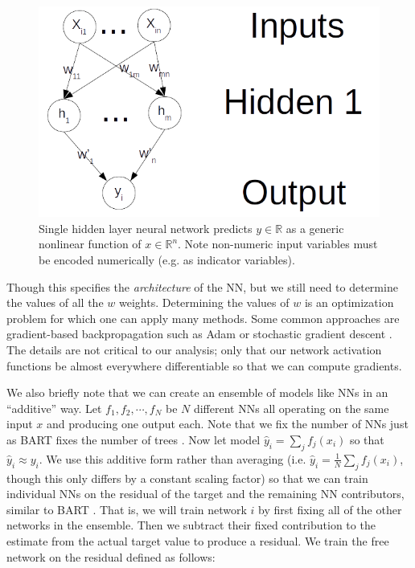 \documentclass[12pt]{article}
\begin{document}
\begin{figure}[htb]
\centering
    \includegraphics[scale=1]{nn.png}
    \caption{Single hidden layer neural network predicts $y \in \mathbb{R}$ as a generic nonlinear function of $x \in \mathbb{R}^n$.  Note non-numeric input variables must be encoded numerically (e.g. as indicator variables).}
    \label{fig:nn}
\end{figure}

Though this specifies the \emph{architecture} of the NN, but we still need to determine the values of all the $w$ weights.  Determining the values of $w$ is an optimization problem for which one can apply many methods.  Some common approaches are gradient-based backpropagation such as Adam \cite{kingma2014adam} or stochastic gradient descent \cite{hastie2009elements}.  The details are not critical to our analysis; only that our network activation functions be almost everywhere differentiable so that we can compute gradients.

We also briefly note that we can create an ensemble of models like NNs in an ``additive'' way.  Let $f_1, f_2, \cdots, f_N$ be $N$ different NNs all operating on the same input $x$ and producing one output each.  Note that we fix the number of NNs just as BART fixes the number of trees \cite{chipman2010bart}.  Now let model $\hat{y}_i = \sum_j f_j(x_i)$ so that $\hat{y}_i \approx y_i$.  We use this additive form rather than averaging (i.e. $\hat{y}_i = \frac{1}{N} \sum_j f_j(x_i)$, though this only differs by a constant scaling factor) so that we can train individual NNs on the residual of the target and the remaining NN contributors, similar to BART \cite{chipman2010bart}.  That is, we will train network $i$ by first fixing all of the other networks in the ensemble.  Then we subtract their fixed contribution to the estimate from the actual target value to produce a residual.  We train the free network on the residual defined as follows:
\end{document}
